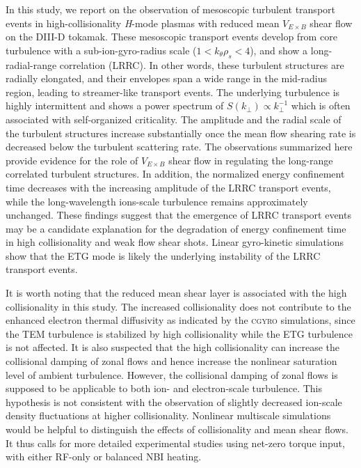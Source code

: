 \documentclass[english,aip,pop,superscriptaddress,preprint,letterpaper]{revtex4-2}
\begin{document}
In this study, we report on the observation of mesoscopic turbulent transport events in high-collisionality \emph{H}-mode plasmas with reduced mean $V_{E\times B}$ shear flow on the DIII-D tokamak.
These mesoscopic transport events develop from core turbulence with a sub-ion-gyro-radius scale ($1<k_{\theta}\rho_{s}<4$), and show a long-radial-range correlation (LRRC). 
In other words, these turbulent structures are radially elongated, and their envelopes span a wide range in the mid-radius region, leading to streamer-like transport events. 
The underlying turbulence is highly intermittent and shows a power spectrum of $S(k_{\perp}) \propto k_{\perp}^{-1}$ which is often associated with self-organized criticality.
The amplitude and the radial scale of the turbulent structures increase substantially once the mean flow shearing rate is decreased below the turbulent scattering rate. 
The observations summarized here provide evidence for the role of $V_{E\times B}$ shear flow in regulating the long-range correlated turbulent structures.
In addition, the normalized energy confinement time decreases with the increasing amplitude of the LRRC transport events, while the long-wavelength ions-scale turbulence remains approximately unchanged.
These findings suggest that the emergence of LRRC transport events may be a candidate explanation for the degradation of energy confinement time in high collisionality and weak flow shear shots.
Linear gyro-kinetic simulations show that the ETG mode is likely the underlying instability of the LRRC transport events.

It is worth noting that the reduced mean shear layer is associated with the high collisionality in this study.
The increased collisionality does not contribute to the enhanced electron thermal diffusivity as indicated by the \textsc{cgyro} simulations, since the TEM turbulence is stabilized by high collisionality while the ETG turbulence is not affected.
It is also suspected that the high collisionality can increase the collisional damping of zonal flows and hence increase the nonlinear saturation level of ambient turbulence.
However, the collisional damping of zonal flows is supposed to be applicable to both ion- and electron-scale turbulence. 
This hypothesis is not consistent with the observation of slightly decreased ion-scale density fluctuations at higher collisionality.
Nonlinear multiscale simulations would be helpful to distinguish the effects of collisionality and mean shear flows.
It thus calls for more detailed experimental studies using net-zero torque input, with either RF-only or balanced NBI heating.
\end{document}
